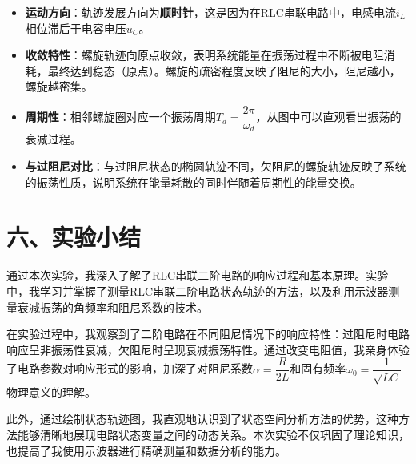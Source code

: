 \documentclass[12pt,a4paper]{article}
\begin{document}
\begin{itemize}[label={}]
\begin{itemize}
        \item \textbf{运动方向}：轨迹发展方向为\textbf{顺时针}，这是因为在RLC串联电路中，电感电流$i_L$相位滞后于电容电压$u_C$。
        
        \item \textbf{收敛特性}：螺旋轨迹向原点收敛，表明系统能量在振荡过程中不断被电阻消耗，最终达到稳态（原点）。螺旋的疏密程度反映了阻尼的大小，阻尼越小，螺旋越密集。
        
        \item \textbf{周期性}：相邻螺旋圈对应一个振荡周期$T_d = \dfrac{2\pi}{\omega_d}$，从图中可以直观看出振荡的衰减过程。
        
        \item \textbf{与过阻尼对比}：与过阻尼状态的椭圆轨迹不同，欠阻尼的螺旋轨迹反映了系统的振荡性质，说明系统在能量耗散的同时伴随着周期性的能量交换。
    \end{itemize}
    
\end{itemize}

\section*{六、实验小结}
通过本次实验，我深入了解了RLC串联二阶电路的响应过程和基本原理。实验中，我学习并掌握了测量RLC串联二阶电路状态轨迹的方法，以及利用示波器测量衰减振荡的角频率和阻尼系数的技术。

在实验过程中，我观察到了二阶电路在不同阻尼情况下的响应特性：过阻尼时电路响应呈非振荡性衰减，欠阻尼时呈现衰减振荡特性。通过改变电阻值，我亲身体验了电路参数对响应形式的影响，加深了对阻尼系数$\alpha = \dfrac{R}{2L}$和固有频率$\omega_0 = \dfrac{1}{\sqrt{LC}}$物理意义的理解。

此外，通过绘制状态轨迹图，我直观地认识到了状态空间分析方法的优势，这种方法能够清晰地展现电路状态变量之间的动态关系。本次实验不仅巩固了理论知识，也提高了我使用示波器进行精确测量和数据分析的能力。
\end{document}
